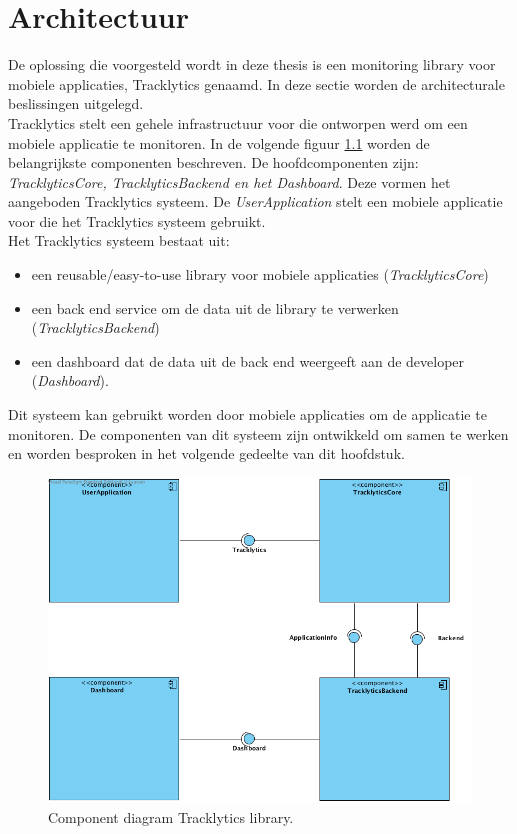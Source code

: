 \chapter{Architectuur}\label{architectuur}
De oplossing die voorgesteld wordt in deze thesis is een monitoring library voor mobiele applicaties, Tracklytics genaamd. In deze sectie worden de architecturale beslissingen uitgelegd.\\

Tracklytics stelt een gehele infrastructuur voor die ontworpen werd om een mobiele applicatie te monitoren. In de volgende figuur \ref{fig:component} worden de belangrijkste componenten beschreven. De hoofdcomponenten zijn: \textit{TracklyticsCore, TracklyticsBackend en het Dashboard}. Deze vormen het aangeboden Tracklytics systeem. De \textit{UserApplication} stelt een mobiele applicatie voor die het Tracklytics systeem gebruikt. \\

Het Tracklytics systeem bestaat uit:
\begin{itemize}
\item een reusable/easy-to-use library voor mobiele applicaties (\textit{TracklyticsCore})
\item een back end service om de data uit de library te verwerken (\textit{TracklyticsBackend})
\item een dashboard dat de data uit de back end weergeeft aan de developer (\textit{Dashboard}).
\end{itemize}

Dit systeem kan gebruikt worden door mobiele applicaties om de applicatie te monitoren. De componenten van dit systeem zijn ontwikkeld om samen te werken en worden besproken in het volgende gedeelte van dit hoofdstuk. 


\begin{figure}[!h]
  \centering
  \includegraphics[scale=0.4]{Afbeeldingen/Architectuur/Component}
  \caption{Component diagram Tracklytics library.}
  \label{fig:component}
\end{figure}

